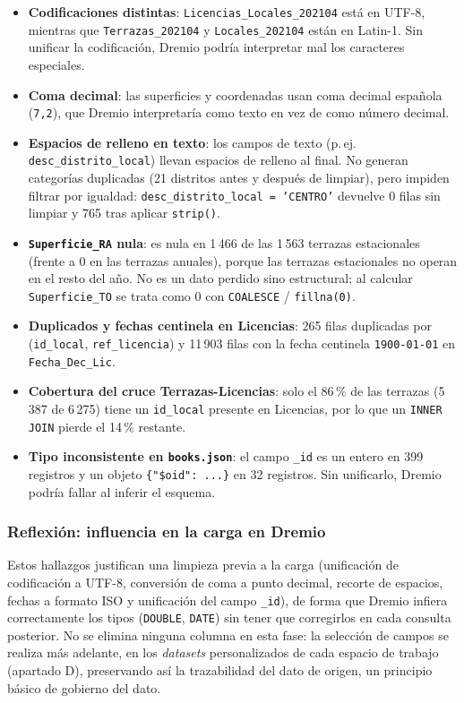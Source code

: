 \documentclass[11pt]{article}
\begin{document}
\begin{itemize}
    \item \textbf{Codificaciones distintas}: \texttt{Licencias\_Locales\_202104} está en
    UTF-8, mientras que \texttt{Terrazas\_202104} y \texttt{Locales\_202104} están en
    Latin-1. Sin unificar la codificación, Dremio podría interpretar mal los caracteres
    especiales.
    \item \textbf{Coma decimal}: las superficies y coordenadas usan coma decimal española
    (\texttt{7,2}), que Dremio interpretaría como texto en vez de como número decimal.
    \item \textbf{Espacios de relleno en texto}: los campos de texto (p.\,ej.
    \texttt{desc\_distrito\_local}) llevan espacios de relleno al final. No generan
    categorías duplicadas (21 distritos antes y después de limpiar), pero impiden filtrar
    por igualdad: \texttt{desc\_distrito\_local = 'CENTRO'} devuelve 0 filas sin limpiar y
    765 tras aplicar \texttt{strip()}.
    \item \textbf{\texttt{Superficie\_RA} nula}: es nula en 1\,466 de las 1\,563 terrazas
    estacionales (frente a 0 en las terrazas anuales), porque las terrazas estacionales no
    operan en el resto del año. No es un dato perdido sino estructural; al calcular
    \texttt{Superficie\_TO} se trata como 0 con \texttt{COALESCE} / \texttt{fillna(0)}.
    \item \textbf{Duplicados y fechas centinela en Licencias}: 265 filas duplicadas por
    (\texttt{id\_local}, \texttt{ref\_licencia}) y 11\,903 filas con la fecha centinela
    \texttt{1900-01-01} en \texttt{Fecha\_Dec\_Lic}.
    \item \textbf{Cobertura del cruce Terrazas-Licencias}: solo el 86\,\% de las terrazas
    (5\,387 de 6\,275) tiene un \texttt{id\_local} presente en Licencias, por lo que un
    \texttt{INNER JOIN} pierde el 14\,\% restante.
    \item \textbf{Tipo inconsistente en \texttt{books.json}}: el campo \texttt{\_id} es un
    entero en 399 registros y un objeto \texttt{\{"\$oid": ...\}} en 32 registros. Sin
    unificarlo, Dremio podría fallar al inferir el esquema.
\end{itemize}

\subsubsection{Reflexión: influencia en la carga en Dremio}

Estos hallazgos justifican una limpieza previa a la carga (unificación de codificación a
UTF-8, conversión de coma a punto decimal, recorte de espacios, fechas a formato ISO y
unificación del campo \texttt{\_id}), de forma que Dremio infiera correctamente los tipos
(\texttt{DOUBLE}, \texttt{DATE}) sin tener que corregirlos en cada consulta posterior. No
se elimina ninguna columna en esta fase: la selección de campos se realiza más adelante,
en los \emph{datasets} personalizados de cada espacio de trabajo (apartado D), preservando
así la trazabilidad del dato de origen, un principio básico de gobierno del dato.
\end{document}
